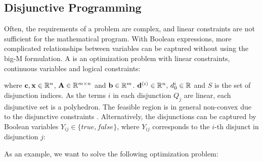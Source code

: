 \subsection{Disjunctive Programming}
Often, the requirements of a problem are complex, and linear constraints are not sufficient for the mathematical program. With Boolean expressions, more complicated relationships between variables can be captured without using the big-M formulation.     
A  is an optimization problem with linear constraints, continuous variables and logical constraints:


\quad where $\bold c, \bold x \in \mathbb{R}^n$, $ \bold A \in \mathbb{R}^{m \times n}$ and $\bold b \in \mathbb{R}^m$. $\bold d^{(i)} \in \mathbb{R}^n, \, d_{0}^i \in \mathbb{R}$ and $S$ is the set of disjunction indices.
As the terms $i$ in each disjunction $Q_j$ are linear, each disjunctive set is a polyhedron. The feasible region is in general non-convex due to the disjunctive constraints \cite{balas_disjunctive_2018}.
Alternatively, the disjunctions can be captured by Boolean variables $Y_{ij} \in \{true, false \}$, where $Y_{ij}$ corresponds to the $i$-th disjunct in disjunction $j$:

As an example, we want to solve the following optimization problem:

